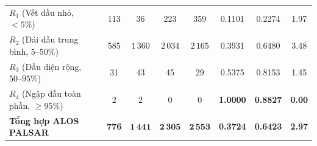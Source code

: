 \begin{table}[!t]
{\begin{tabular}{lccccccc}
$R_1$ (Vết dầu nhỏ, $<5\%$) & 113 & 36 & 223 & 359 & 0.1101 & 0.2274 & 1.97 \\
$R_2$ (Dải dầu trung bình, $5\text{--}50\%$) & 585 & $1\,360$ & $2\,034$ & $2\,165$ & 0.3931 & 0.6480 & 3.48 \\
$R_3$ (Dầu diện rộng, $50\text{--}95\%$) & 31 & 43 & 45 & 29 & 0.5375 & 0.8153 & 1.45 \\
$R_4$ (Ngập dầu toàn phần, $\ge 95\%$) & 2 & 2 & 0 & 0 & \textbf{1.0000} & \textbf{0.8827} & \textbf{0.00} \\
\textbf{Tổng hợp ALOS PALSAR} & \textbf{776} & $\mathbf{1\,441}$ & $\mathbf{2\,305}$ & $\mathbf{2\,553}$ & \textbf{0.3724} & \textbf{0.6423} & \textbf{2.97} \\
\bottomrule
\end{tabular}%
}
\end{table}


